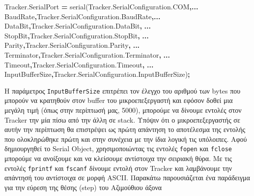 \documentclass[
  a4paper,
  twoside,
  titlepage,
  11pt]{article}
\newenvironment{Shaded}{\begin{snugshade}}{\end{snugshade}}
\newcommand{\NormalTok}[1]{#1}
\newcommand{\OperatorTok}[1]{\textcolor[rgb]{0.81,0.36,0.00}{\textbf{#1}}}
\newcommand{\SpecialStringTok}[1]{\textcolor[rgb]{0.31,0.60,0.02}{#1}}
\newcommand{\VariableTok}[1]{\textcolor[rgb]{0.00,0.00,0.00}{#1}}
\numberwithin{equation}{section}
\numberwithin{figure}{section}
\numberwithin{table}{section}
\begin{document}
\begin{Shaded}
\begin{Highlighting}[]
\VariableTok{Tracker}\NormalTok{.}\VariableTok{SerialPort} \OperatorTok{=} \VariableTok{serial}\NormalTok{(}\VariableTok{Tracker}\NormalTok{.}\VariableTok{SerialConfiguration}\NormalTok{.}\VariableTok{COM}\OperatorTok{,...}
    \SpecialStringTok{\textquotesingle{}BaudRate\textquotesingle{}}\OperatorTok{,}\VariableTok{Tracker}\NormalTok{.}\VariableTok{SerialConfiguration}\NormalTok{.}\VariableTok{BaudRate}\OperatorTok{,...}
    \SpecialStringTok{\textquotesingle{}DataBit\textquotesingle{}}\OperatorTok{,}\VariableTok{Tracker}\NormalTok{.}\VariableTok{SerialConfiguration}\NormalTok{.}\VariableTok{DataBit}\OperatorTok{,} \OperatorTok{...}
    \SpecialStringTok{\textquotesingle{}StopBit\textquotesingle{}}\OperatorTok{,}\VariableTok{Tracker}\NormalTok{.}\VariableTok{SerialConfiguration}\NormalTok{.}\VariableTok{StopBit}\OperatorTok{,} \OperatorTok{...}
    \SpecialStringTok{\textquotesingle{}Parity\textquotesingle{}}\OperatorTok{,}\VariableTok{Tracker}\NormalTok{.}\VariableTok{SerialConfiguration}\NormalTok{.}\VariableTok{Parity}\OperatorTok{,} \OperatorTok{...}
    \SpecialStringTok{\textquotesingle{}Terminator\textquotesingle{}}\OperatorTok{,}\VariableTok{Tracker}\NormalTok{.}\VariableTok{SerialConfiguration}\NormalTok{.}\VariableTok{Terminator}\OperatorTok{,} \OperatorTok{...}
    \SpecialStringTok{\textquotesingle{}Timeout\textquotesingle{}}\OperatorTok{,}\VariableTok{Tracker}\NormalTok{.}\VariableTok{SerialConfiguration}\NormalTok{.}\VariableTok{Timeout}\OperatorTok{,} \OperatorTok{...}
    \SpecialStringTok{\textquotesingle{}InputBufferSize\textquotesingle{}}\OperatorTok{,}\VariableTok{Tracker}\NormalTok{.}\VariableTok{SerialConfiguration}\NormalTok{.}\VariableTok{InputBufferSize}\NormalTok{)}\OperatorTok{;}
\end{Highlighting}
\end{Shaded}

Η παράμετρος \texttt{InputBufferSize} επιτρέπει τον έλεγχο του αριθμού των bytes που μπορούν
να κρατηθούν στον buffer του μικροεπεξεργαστή και εφόσον δοθεί μια μεγάλη τιμή (όπως
στην περίπτωσή μας, 5000), μπορούμε να δίνουμε εντολές στον Tracker την μία πίσω από
την άλλη σε stack. Υπόψιν ότι ο μικροεπεξεργαστής σε αυτήν την περίπτωση θα
επιστρέψει ως πρώτη απάντηση το αποτέλεσμα της εντολής που ολοκληρώθηκε πρώτη και
στην συνέχεια με την ίδια λογική τις υπόλοιπες. Αφού δημιουργηθεί το Serial Object,
χρησιμοποιώντας τις εντολές \texttt{fopen} και \texttt{fclose} μπορούμε να ανοίξουμε και να
κλείσουμε αντίστοιχα την σειριακή θύρα. Με τις εντολές \texttt{fprintf} και \texttt{fscanf} δίνουμε
εντολή στον Tracker και λαμβάνουμε την απάντησή του αντίστοιχα σε μορφή ASCII.
Παρακάτω παρουσιάζεται ένα παράδειγμα για την εύρεση της θέσης (step) του Αζιμούθιου
άξονα
\end{document}
